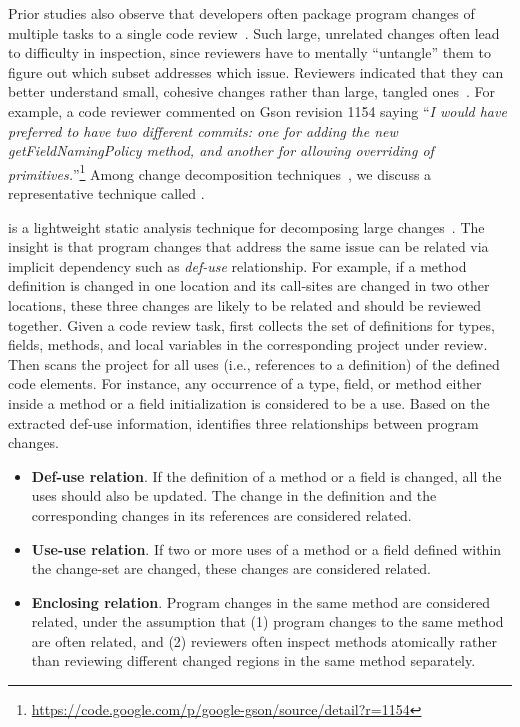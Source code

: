 Prior studies also observe that developers often package program changes of multiple tasks to a single code review~\cite{Kawrykow2011,Murphy-Hill2012:refactor,herzig2013impact}. Such large, unrelated changes often lead to difficulty in inspection, since reviewers have to mentally ``untangle'' them to figure out which subset addresses which issue. Reviewers indicated that they can better understand small, cohesive changes rather than large, tangled ones~\cite{Rigby2008:apache}. For example, a code reviewer commented on Gson revision 1154 saying ``{\em I would have preferred to have two different commits: one for adding the new {\ttt getFieldNamingPolicy} method, and another for allowing overriding of primitives.}''\footnote{\url{https://code.google.com/p/google-gson/source/detail?r=1154}} Among change decomposition techniques~\cite{tao2015partitioning,barnett2015helping}, we discuss a representative technique called {\clusterchanges}. 

{\clusterchanges} is a lightweight static analysis technique for decomposing large changes~\cite{barnett2015helping}. The insight is that program changes that address the same issue can be related via implicit dependency such as {\em def-use} relationship. For example, if a method definition is changed in one location and its call-sites are changed in two other locations, these three changes are likely to be related and should be reviewed together. Given a code review task, {\clusterchanges} first collects the set of definitions for types, fields, methods, and local variables in the corresponding project under review. Then {\clusterchanges} scans the project for all uses (i.e., references to a definition) of the defined code elements. For instance, any occurrence of a type, field, or method either inside a method or a field initialization is considered to be a use. Based on the extracted def-use information, {\clusterchanges} identifies three relationships between program changes. 

\begin{itemize}
	\item {\bf Def-use relation}. If the definition of a method or a field is changed, all the uses should also be updated. The change in the definition and the corresponding changes in its references are considered related.
	\item {\bf Use-use relation}. If two or more uses of a method or a field defined within the change-set are changed, these changes are considered related. 
	\item  {\bf Enclosing relation}. Program changes in the same method are considered related, under the assumption that  (1) program changes to the same method are often related, and (2) reviewers often inspect methods atomically rather than reviewing different changed regions in the same method separately.
\end{itemize} 

